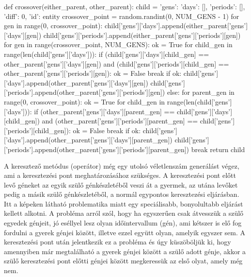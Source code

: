 \documentclass[12pt,a4paper]{report}
\begin{document}
\begin{python}
def crossover(either_parent, other_parent):
    child = {'gens': {'days': [], 'periods': []}, 'diff': 0, 'id': entity}
    crossover_point = random.randint(0, NUM_GENS - 1)
    for gen in range(0, crossover_point):
        child['gens']['days'].append(either_parent['gens']['days'][gen])
        child['gens']['periods'].append(either_parent['gens']['periods'][gen])
    for gen in range(crossover_point, NUM_GENS):
        ok = True
        for child_gen in range(len(child['gens']['days'])):
            if (child['gens']['days'][child_gen] == other_parent['gens']['days'][gen]) and (child['gens']['periods'][child_gen] == other_parent['gens']['periods'][gen]):
                ok = False
                break
        if ok:
            child['gens']['days'].append(other_parent['gens']['days'][gen])
            child['gens']['periods'].append(other_parent['gens']['periods'][gen])
        else:
            for parent_gen in range(0, crossover_point):
                ok = True
                for child_gen in range(len(child['gens']['days'])):
                    if (other_parent['gens']['days'][parent_gen] == child['gens']['days'][child_gen]) and (other_parent['gens']['periods'][parent_gen] == child['gens']['periods'][child_gen]):
                        ok = False
                        break
                if ok:
                    child['gens']['days'].append(other_parent['gens']['days'][parent_gen])
                    child['gens']['periods'].append(other_parent['gens']['periods'][parent_gen])
                    break
    return child
\end{python}

A keresztező metódus (operátor) még egy utolsó véletlenszám generálást végez, ami a keresztezési pont meghatározásához szükséges. A keresztezési pont előtt levő géneket az egyik szülő génkészletéből veszi át a gyermek, az utána levőket pedig a másik szülő génkészletéből, a normál egypontos keresztezési eljárásban. Itt a képeken látható problematika miatt egy speciálisabb, bonyolultabb eljárást kellett alkotni. A probléma arról szól, hogy ha egyszerűen csak átvesszük a szülő egyedek génjeit, jó eséllyel lesz olyan időintervallum (gén), ami kétszer is elő fog fordulni a gyerek génjei között, illetve ezzel együtt olyan, amelyik egyszer sem. A keresztezési pont után jelentkezik ez a probléma és úgy küszöböljük ki, hogy amennyiben már megtalálható a gyerek génjei között a szülő adott génje, akkor a szülő keresztezési pont előtti génjei között megkeressük az első olyat, amely még nem.
\end{document}
